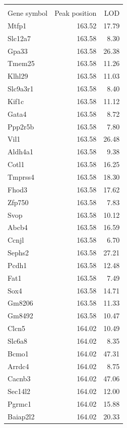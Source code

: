 \documentclass{article}
\begin{document}
\begin{boehm}

\begin{longtable}{lrr}
\hline \\

Gene symbol & Peak position & LOD \\
  \hline
Mtfp1 & 163.52 & 17.79 \\
  Slc12a7 & 163.58 & 8.30 \\
  Gpa33 & 163.58 & 26.38 \\
  Tmem25 & 163.58 & 11.26 \\
  Klhl29 & 163.58 & 11.03 \\
  Slc9a3r1 & 163.58 & 8.40 \\
  Kif1c & 163.58 & 11.12 \\
  Gata4 & 163.58 & 8.72 \\
  Ppp2r5b & 163.58 & 7.80 \\
  Vil1 & 163.58 & 26.48 \\
  Aldh4a1 & 163.58 & 9.38 \\
  Cotl1 & 163.58 & 16.25 \\
  Tmprss4 & 163.58 & 18.30 \\
  Fhod3 & 163.58 & 17.62 \\
  Zfp750 & 163.58 & 7.83 \\
  Svop & 163.58 & 10.12 \\
  Abcb4 & 163.58 & 16.59 \\
  Ccnjl & 163.58 & 6.70 \\
  Sephs2 & 163.58 & 27.21 \\
  Pcdh1 & 163.58 & 12.48 \\
  Fat1 & 163.58 & 7.49 \\
  Sox4 & 163.58 & 14.71 \\
  Gm8206 & 163.58 & 11.33 \\
  Gm8492 & 163.58 & 10.47 \\
  Clcn5 & 164.02 & 10.49 \\
  Slc6a8 & 164.02 & 8.35 \\
  Bcmo1 & 164.02 & 47.31 \\
  Arrdc4 & 164.02 & 8.75 \\
  Cacnb3 & 164.02 & 47.06 \\
  Sec14l2 & 164.02 & 12.00 \\
  Pgrmc1 & 164.02 & 15.88 \\
  Baiap2l2 & 164.02 & 20.33 \\

\end{longtable}
\end{boehm}
\end{document}
